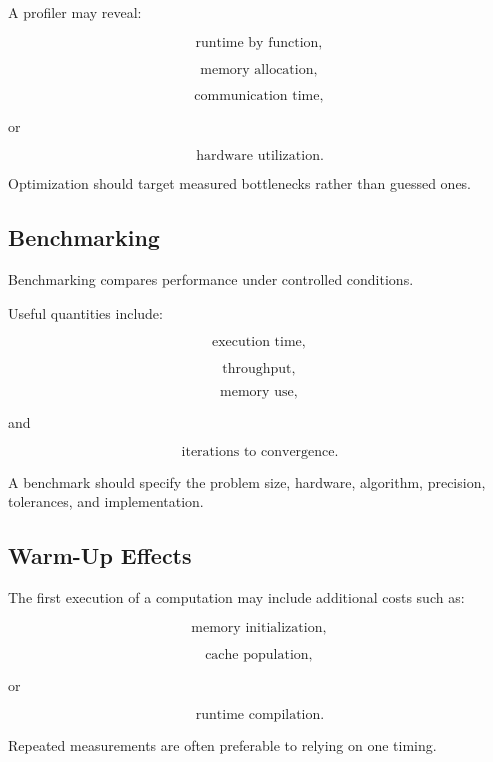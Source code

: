 A profiler may reveal:

\[
\boxed{
\text{runtime by function},
}
\]

\[
\boxed{
\text{memory allocation},
}
\]

\[
\boxed{
\text{communication time},
}
\]

or

\[
\boxed{
\text{hardware utilization}.
}
\]

Optimization should target measured bottlenecks rather than guessed ones.

\subsection{Benchmarking}
\label{subsec:scientific-benchmarking}

Benchmarking compares performance under controlled conditions.

Useful quantities include:

\[
\boxed{
\text{execution time},
}
\]

\[
\boxed{
\text{throughput},
}
\]

\[
\boxed{
\text{memory use},
}
\]

and

\[
\boxed{
\text{iterations to convergence}.
}
\]

A benchmark should specify the problem size, hardware, algorithm,
precision, tolerances, and implementation.

\subsection{Warm-Up Effects}
\label{subsec:benchmark-warmup}

The first execution of a computation may include additional costs such as:

\[
\boxed{
\text{memory initialization},
}
\]

\[
\boxed{
\text{cache population},
}
\]

or

\[
\boxed{
\text{runtime compilation}.
}
\]

Repeated measurements are often preferable to relying on one timing.

